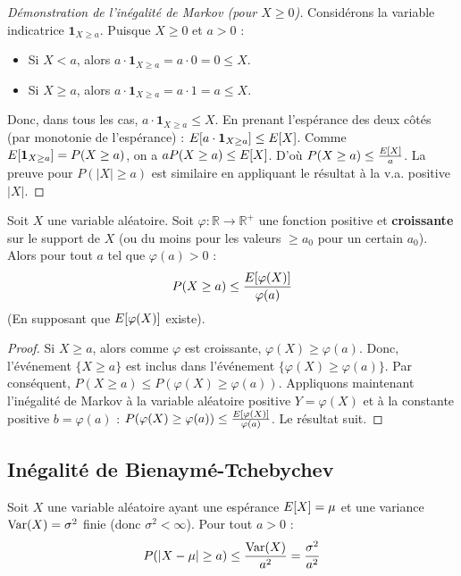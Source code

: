 \begin{proof}[Démonstration de l'inégalité de Markov (pour $X \ge 0$)]
Considérons la variable indicatrice $\mathbf{1}_{X \ge a}$. Puisque $X \ge 0$ et $a > 0$ : 
\begin{itemize}
    \item Si $X < a$, alors $a \cdot \mathbf{1}_{X \ge a} = a \cdot 0 = 0 \le X$.
    \item Si $X \ge a$, alors $a \cdot \mathbf{1}_{X \ge a} = a \cdot 1 = a \le X$.
\end{itemize}
Donc, dans tous les cas, $a \cdot \mathbf{1}_{X \ge a} \le X$. En prenant l'espérance des deux côtés (par monotonie de l'espérance) : $E[a \cdot \mathbf{1}_{X \ge a}] \le E[X]$. Comme $E[\mathbf{1}_{X \ge a}] = P(X \ge a)$, on a $aP(X \ge a) \le E[X]$. D'où $P(X \ge a) \le \frac{E[X]}{a}$. La preuve pour $P(|X| \ge a)$ est similaire en appliquant le résultat à la v.a. positive $|X|$.
\end{proof}

\begin{proposition}
Soit $X$ une variable aléatoire. Soit $\varphi : \mathbb{R} \to \mathbb{R}^+$ une fonction positive et \textbf{croissante} sur le support de $X$ (ou du moins pour les valeurs $\ge a_0$ pour un certain $a_0$). Alors pour tout $a$ tel que $\varphi(a) > 0$ :
\[ P(X \ge a) \le \frac{E[\varphi(X)]}{\varphi(a)} \]
(En supposant que $E[\varphi(X)]$ existe).
\end{proposition}

\begin{proof}
Si $X \ge a$, alors comme $\varphi$ est croissante, $\varphi(X) \ge \varphi(a)$. Donc, l'événement $\{X \ge a\}$ est inclus dans l'événement $\{\varphi(X) \ge \varphi(a)\}$. Par conséquent, $P(X \ge a) \le P(\varphi(X) \ge \varphi(a))$. Appliquons maintenant l'inégalité de Markov à la variable aléatoire positive $Y = \varphi(X)$ et à la constante positive $b = \varphi(a)$ : $P(\varphi(X) \ge \varphi(a)) \le \frac{E[\varphi(X)]}{\varphi(a)}$. Le résultat suit.
\end{proof}

\subsection{Inégalité de Bienaymé-Tchebychev}

Soit $X$ une variable aléatoire ayant une espérance $E[X] = \mu$ et une variance $\operatorname{Var}(X) = \sigma^2$ finie (donc $\sigma^2 < \infty$). Pour tout $a > 0$ :
\[ P(|X - \mu| \ge a) \le \frac{\operatorname{Var}(X)}{a^2} = \frac{\sigma^2}{a^2} \]

